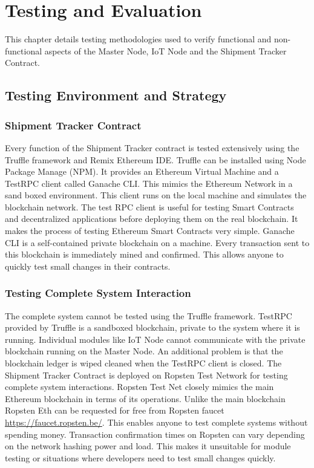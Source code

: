 \section{Testing and Evaluation}
This chapter details testing methodologies used to verify functional and non-functional aspects of the Master Node, IoT Node and the Shipment Tracker Contract.
\subsection{Testing Environment and Strategy}
\vspace{0.5cm}
\subsubsection{Shipment Tracker Contract}
Every function of the Shipment Tracker contract is tested extensively using the Truffle framework and Remix Ethereum IDE. Truffle can be installed using Node Package Manage (NPM). It provides an Ethereum Virtual Machine and a TestRPC client called Ganache CLI. This mimics the Ethereum Network in a sand boxed environment. This client runs on the local machine and simulates the blockchain network. The test RPC client is useful for testing Smart Contracts and decentralized applications before deploying them on the real blockchain.  It makes the process of testing Ethereum Smart Contracts very simple. Ganache CLI is a self-contained private blockchain on a machine. Every transaction sent to this blockchain is immediately mined and confirmed. This allows anyone to quickly test small changes in their contracts.
\vspace{0.5cm}
\subsubsection{Testing Complete System Interaction}
The complete system cannot be tested using the Truffle framework. TestRPC provided by Truffle is a sandboxed blockchain, private to the system where it is running. Individual modules like IoT Node cannot communicate with the private blockchain running on the Master Node. An additional problem is that the blockchain ledger is wiped cleaned when the TestRPC client is closed. The Shipment Tracker Contract is deployed on Ropsten Test Network for testing complete system interactions. Ropsten Test Net closely mimics the main Ethereum blockchain in terms of its operations. Unlike the main blockchain Ropsten Eth can be requested for free from Ropsten faucet \url{https://faucet.ropsten.be/}. This enables anyone to test complete systems without spending money. Transaction confirmation times on Ropsten can vary depending on the network hashing power and load. This makes it unsuitable for module testing or situations where developers need to test small changes quickly.
\vspace{0.5cm}
